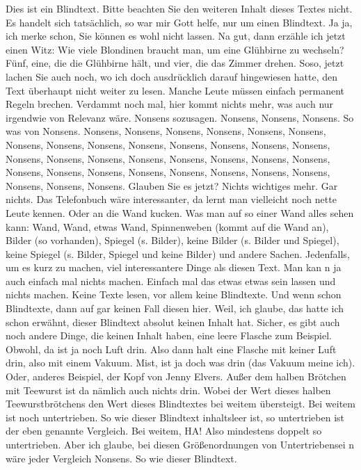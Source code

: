Dies ist ein Blindtext. Bitte beachten Sie den weiteren Inhalt dieses Textes nicht. Es handelt sich tatsächlich, so war mir Gott helfe, nur um einen Blindtext. Ja ja, ich merke schon, Sie können es wohl nicht lassen. Na gut, dann erzähle ich jetzt einen Witz: Wie viele Blondinen braucht man, um eine Glühbirne zu wechseln? Fünf, eine, die die Glühbirne hält, und vier, die das Zimmer drehen. Soso, jetzt lachen Sie auch noch, wo ich doch ausdrücklich darauf hingewiesen hatte, den Text überhaupt nicht weiter zu lesen. Manche Leute müssen einfach permanent Regeln brechen. Verdammt noch mal, hier kommt nichts mehr, was auch nur irgendwie von Relevanz wäre. Nonsens sozusagen. Nonsens, Nonsens, Nonsens. So was von Nonsens. Nonsens, Nonsens, Nonsens, Nonsens, Nonsens, Nonsens, Nonsens, Nonsens, Nonsens, Nonsens, Nonsens, Nonsens, Nonsens, Nonsens, Nonsens, Nonsens, Nonsens, Nonsens, Nonsens, Nonsens, Nonsens, Nonsens, Nonsens, Nonsens, Nonsens, Nonsens, Nonsens, Nonsens, Nonsens, Nonsens, Nonsens, Nonsens, Nonsens. Glauben Sie es jetzt? Nichts wichtiges mehr. Gar nichts. Das Telefonbuch wäre interessanter, da lernt man vielleicht noch nette Leute kennen. Oder an die Wand kucken. Was man auf so einer Wand alles sehen kann: Wand, Wand, etwas Wand, Spinnenweben (kommt auf die Wand an), Bilder (so vorhanden), Spiegel (s. Bilder), keine Bilder (s. Bilder und Spiegel), keine Spiegel (s. Bilder, Spiegel und keine Bilder) und andere Sachen. Jedenfalls, um es kurz zu machen, viel interessantere Dinge als diesen Text. Man kan n ja auch einfach mal nichts machen. Einfach mal das etwas etwas sein lassen und nichts machen. Keine Texte lesen, vor allem keine Blindtexte. Und wenn schon Blindtexte, dann auf gar keinen Fall diesen hier. Weil, ich glaube, das hatte ich schon erwähnt, dieser Blindtext absolut keinen Inhalt hat. Sicher, es gibt auch noch andere Dinge, die keinen Inhalt haben, eine leere Flasche zum Beispiel. Obwohl, da ist ja noch Luft drin. Also dann halt eine Flasche mit keiner Luft drin, also mit einem Vakuum. Mist, ist ja doch was drin (das Vakuum meine ich). Oder, anderes Beispiel, der Kopf von Jenny Elvers. Außer dem halben Brötchen mit Teewurst ist da nämlich auch nichts drin. Wobei der Wert dieses halben Teewurstbrötchens den Wert dieses Blindtextes bei weitem übersteigt. Bei weitem ist noch untertrieben. So wie dieser Blindtext inhaltsleer ist, so untertrieben ist der eben genannte Vergleich. Bei weitem, HA! Also mindestens doppelt so untertrieben. Aber ich glaube, bei diesen Größenordnungen von Untertriebensei n wäre jeder Vergleich Nonsens. So wie dieser Blindtext.

